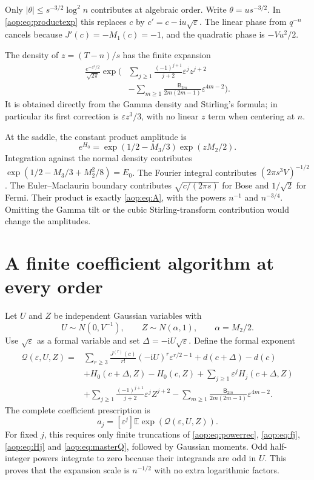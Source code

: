 \documentclass[11pt]{article}
\theoremstyle{remark}\newtheorem{remark}[theorem]{Remark}
\newcommand{\E}{\mathbb E}
\newcommand{\eps}{\varepsilon}
\newcommand{\ii}{\mathrm i}
\newcommand{\coeff}[2]{[#1^{#2}]}
\begin{document}
Only $|\theta|\le s^{-3/2}\log^2 n$ contributes at algebraic order.
Write $\theta=us^{-3/2}$. In \eqref{aop:eq:productexp} this replaces $c$ by
$c'=c-\ii u\sqrt\eps$. The linear phase from $q^{-n}$ cancels because
$J'(c)=-M_1(c)=-1$, and the quadratic phase is $-Vu^2/2$.

The density of $z=(T-n)/s$ has the finite expansion
\begin{align}\label{aop:eq:gammadensity}
 \frac{e^{-z^2/2}}{\sqrt{2\pi}}
 \exp\bigg(&\sum_{j\ge1}\frac{(-1)^{j+1}}{j+2}\eps^jz^{j+2}
 \\
 &-\sum_{m\ge1}\frac{\mathsf B_{2m}}{2m(2m-1)}\eps^{4m-2}\bigg).
 \nonumber
\end{align}
It is obtained directly from the Gamma density and Stirling's formula;
in particular its first correction is $\eps z^3/3$, with no linear
$z$ term when centering at $n$.

At the saddle, the constant product amplitude is
\[
 e^{H_0}=\exp(1/2-M_3/3)\exp(zM_2/2).
\]
Integration against the normal density contributes
$\exp(1/2-M_3/3+M_2^2/8)=E_0$.
The Fourier integral contributes $(2\pi s^3V)^{-1/2}$. The
Euler--Maclaurin boundary contributes $\sqrt{c/(2\pi s)}$ for Bose
and $1/\sqrt2$ for Fermi. Their product is exactly \eqref{aop:eq:A},
with the powers $n^{-1}$ and $n^{-3/4}$. Omitting the Gamma tilt or
the cubic Stirling-transform contribution would change the amplitudes.

\section{A finite coefficient algorithm at every order}\label{aop:sec:generator}

Let $U$ and $Z$ be independent Gaussian variables with
\[
 U\sim N(0,V^{-1}),\qquad Z\sim N(\alpha,1),\qquad\alpha=M_2/2.
\]
Use $\sqrt\eps$ as a formal variable and set $\Delta=-\ii U\sqrt\eps$.
Define the formal exponent
\begin{align}
 \mathcal Q(\eps,U,Z)={}&
 \sum_{r\ge3}\frac{J^{(r)}(c)}{r!}(-\ii U)^r\eps^{r/2-1}
 +d(c+\Delta)-d(c)\nonumber\\
 &+H_0(c+\Delta,Z)-H_0(c,Z)
 +\sum_{j\ge1}\eps^jH_j(c+\Delta,Z)\nonumber\\
 &+\sum_{j\ge1}\frac{(-1)^{j+1}}{j+2}\eps^jZ^{j+2}
 -\sum_{m\ge1}\frac{\mathsf B_{2m}}{2m(2m-1)}\eps^{4m-2}.
 \label{aop:eq:masterQ}
\end{align}
The complete coefficient prescription is
\begin{equation}\label{aop:eq:master}
 \boxed{\displaystyle a_j=\coeff\eps j\E\exp(\mathcal Q(\eps,U,Z)).}
\end{equation}
For fixed $j$, this requires only finite truncations of
\eqref{aop:eq:powerrec}, \eqref{aop:eq:fj}, \eqref{aop:eq:Hj} and
\eqref{aop:eq:masterQ}, followed by Gaussian moments. Odd half-integer
powers integrate to zero because their integrands are odd in $U$.
This proves that the expansion scale is $n^{-1/2}$ with no extra
logarithmic factors.
\end{document}
